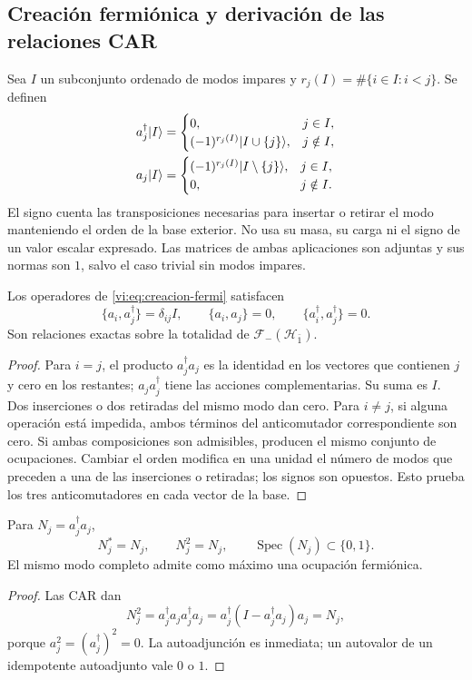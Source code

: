 \subsection{Creación fermiónica y derivación de las relaciones CAR}
\label{vi:subsec:car-construccion}

Sea \(I\) un subconjunto ordenado de modos impares y
\(r_j(I)=\#\{i\in I:i<j\}\). Se definen
\begin{align}
 a_j^\dagger|I\rangle&=
 \begin{cases}
 0,&j\in I,\\
 (-1)^{r_j(I)}|I\cup\{j\}\rangle,&j\notin I,
 \end{cases}\notag\\
 a_j|I\rangle&=
 \begin{cases}
 (-1)^{r_j(I)}|I\setminus\{j\}\rangle,&j\in I,\\
 0,&j\notin I.
 \end{cases}
 \label{vi:eq:creacion-fermi}
\end{align}
El signo cuenta las transposiciones necesarias para insertar o retirar
el modo manteniendo el orden de la base exterior. No usa su masa,
su carga ni el signo de un valor escalar expresado. Las matrices de
ambas aplicaciones son adjuntas y sus normas son \(1\), salvo el
caso trivial sin modos impares.

\begin{theorem}
\label{vi:thm:car-construidas}
Los operadores de \eqref{vi:eq:creacion-fermi} satisfacen
\[
 \{a_i,a_j^\dagger\}=\delta_{ij}I,\qquad
 \{a_i,a_j\}=0,\qquad
 \{a_i^\dagger,a_j^\dagger\}=0.
\]
Son relaciones exactas sobre la totalidad de
\(\mathcal F_-(\mathcal H_{\bar1})\).
\end{theorem}
\begin{proof}
Para \(i=j\), el producto \(a_j^\dagger a_j\) es la identidad
en los vectores que contienen \(j\) y cero en los restantes;
\(a_ja_j^\dagger\) tiene las acciones complementarias. Su suma
es \(I\). Dos inserciones o dos retiradas del mismo modo dan cero.
Para \(i\ne j\), si alguna operación está impedida, ambos términos
del anticomutador correspondiente son cero. Si ambas composiciones
son admisibles, producen el mismo conjunto de ocupaciones. Cambiar
el orden modifica en una unidad el número de modos que preceden a
una de las inserciones o retiradas; los signos son opuestos. Esto
prueba los tres anticomutadores en cada vector de la base.
\end{proof}

\begin{corollary}
\label{vi:cor:pauli-ocupacion}
Para \(N_j=a_j^\dagger a_j\),
\[
 N_j^*=N_j,\qquad N_j^2=N_j,\qquad
 \operatorname{Spec}(N_j)\subset\{0,1\}.
\]
El mismo modo completo admite como máximo una ocupación fermiónica.
\end{corollary}
\begin{proof}
Las CAR dan
\[
 N_j^2=a_j^\dagger a_ja_j^\dagger a_j
 =a_j^\dagger(I-a_j^\dagger a_j)a_j=N_j,
\]
porque \(a_j^2=(a_j^\dagger)^2=0\). La autoadjunción es inmediata;
un autovalor de un idempotente autoadjunto vale \(0\) o \(1\).
\end{proof}

